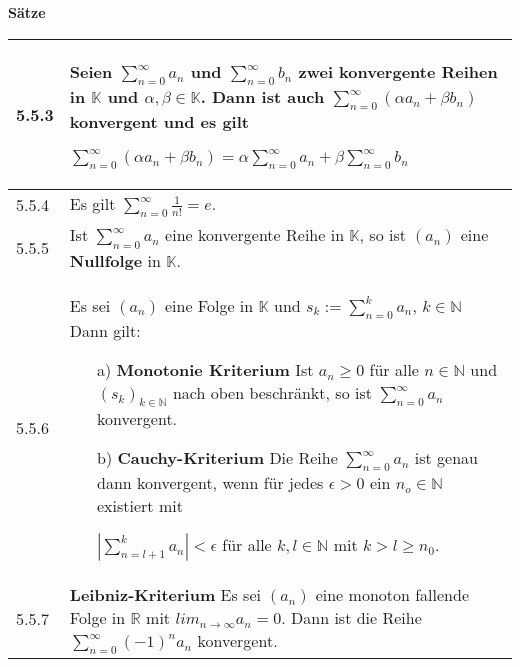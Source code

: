     \noindent 
    \textbf{Sätze}
    \begin{table}[H]
    \begin{tabularx}{\textwidth}{X m{16cm}}
        \toprule

        5.5.3 & Seien $\sum^{\infty}_{n=0} a_n$ und $\sum^{\infty}_{n=0} b_n$ zwei konvergente Reihen in $\mathbb{K}$ und 
                $\alpha, \beta \in \mathbb{K}$. Dann ist auch $\sum^{\infty}_{n=0} (\alpha a_n + \beta b_n)$ konvergent und es gilt \hfill \break
                \centerline{$\sum^{\infty}_{n=0} (\alpha a_n + \beta b_n) = \alpha \sum^{\infty}_{n=0} a_n + \beta \sum^{\infty}_{n=0} b_n$}  \\
        \midrule
        5.5.4 & Es gilt $\sum^{\infty}_{n=0} \frac{1}{n!} = e$. \\
        \midrule
        5.5.5 & Ist $\sum^{\infty}_{n=0} a_n$ eine konvergente Reihe in $\mathbb{K}$, so ist $(a_n)$ eine \textbf{Nullfolge} in $\mathbb{K}$. \\
        \midrule
        5.5.6 & Es sei $(a_n)$ eine Folge in $\mathbb{K}$ und $s_k := \sum^{k}_{n=0} a_n$, $k \in \mathbb{N}$ Dann gilt:
                \begin{itemize}[topsep=-0.5cm]
                    \item[a)] \textbf{Monotonie Kriterium} \hfill \break
                                Ist $a_n \geq 0$ für alle $n \in \mathbb{N}$ und $(s_k)_{k \in \mathbb{N}}$ nach oben beschränkt, so
                                ist $\sum^{\infty}_{n=0} a_n$ konvergent.
                    \item[b)] \textbf{Cauchy-Kriterium} \hfill \break
                                Die Reihe $\sum^{\infty}_{n=0} a_n$ ist genau dann konvergent, wenn für jedes $\epsilon > 0$ ein $n_o \in \mathbb{N}$
                                existiert mit \hfill \break
                                \centerline{$|\sum^{k}_{n=l+1} a_n| < \epsilon$ für alle $k, l \in \mathbb{N}$ mit $k > l \geq n_0$.}
                \end{itemize} \vspace{-0cm} \\
        \midrule
        5.5.7 & \textbf{Leibniz-Kriterium} \hfill \break
                Es sei $(a_n)$ eine monoton fallende Folge in $\mathbb{R}$ mit $lim_{n \rightarrow \infty} a_n = 0$. Dann ist die 
                Reihe $\sum^{\infty}_{n=0} (-1)^n a_n$ konvergent. \\

        \bottomrule
    \end{tabularx}
    \end{table}


